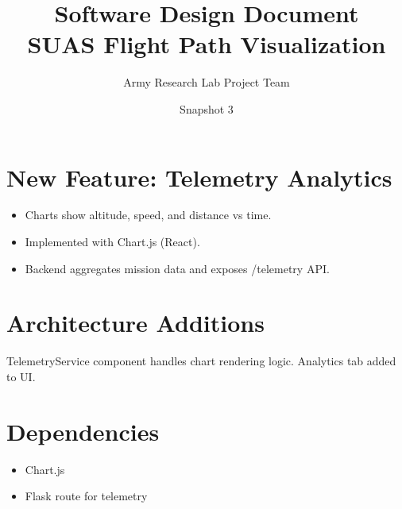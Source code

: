 \documentclass[12pt]{article}
\title{Software Design Document\\SUAS Flight Path Visualization}
\author{Army Research Lab Project Team}
\date{Snapshot 3}
\begin{document}
\maketitle

\tableofcontents
\newpage

\section{New Feature: Telemetry Analytics}
\begin{itemize}
  \item Charts show altitude, speed, and distance vs time.
  \item Implemented with Chart.js (React).
  \item Backend aggregates mission data and exposes /telemetry API.
\end{itemize}

\section{Architecture Additions}
TelemetryService component handles chart rendering logic. Analytics tab added to UI.

\section{Dependencies}
\begin{itemize}
  \item Chart.js
  \item Flask route for telemetry
\end{itemize}
\end{document}
